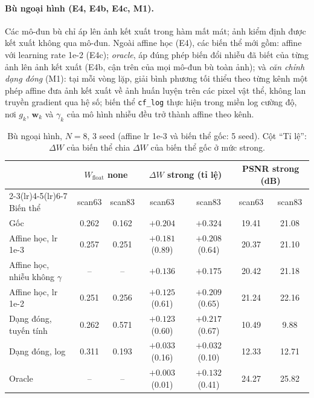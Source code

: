 \documentclass[11pt,a4paper]{article}
\begin{document}
\paragraph{Bù ngoại hình (E4, E4b, E4c, M1).} Các mô-đun bù chỉ áp lên ảnh kết xuất trong hàm mất mát; ảnh kiểm định được kết xuất không qua mô-đun. Ngoài affine học (E4), các biến thể mới gồm: affine với learning rate 1e-2 (E4c); \emph{oracle}, áp đúng phép biến đổi nhiễu đã biết của từng ảnh lên ảnh kết xuất (E4b, cận trên của mọi mô-đun bù toàn ảnh); và \emph{căn chỉnh dạng đóng} (M1): tại mỗi vòng lặp, giải bình phương tối thiểu theo từng kênh một phép affine đưa ảnh kết xuất về ảnh huấn luyện trên các pixel vật thể, không lan truyền gradient qua hệ số; biến thể \texttt{cf\_log} thực hiện trong miền log cường độ, nơi $g_k$, $\mathbf{w}_k$ và $\gamma_k$ của mô hình nhiễu đều trở thành affine theo kênh.
\begin{table}[H]
\centering\small
\caption{Bù ngoại hình, $N=8$, 3 seed (affine lr 1e-3 và biến thể gốc: 5 seed). Cột ``Tỉ lệ'': $\Delta W$ của biến thể chia $\Delta W$ của biến thể gốc ở mức strong.}
\label{tab:comp}
\begin{tabular}{@{}lcccccc@{}}
\toprule
& \multicolumn{2}{c}{$W_{\text{float}}$ none} & \multicolumn{2}{c}{$\Delta W$ strong (tỉ lệ)} & \multicolumn{2}{c}{PSNR strong (dB)} \\
\cmidrule(lr){2-3}\cmidrule(lr){4-5}\cmidrule(lr){6-7}
Biến thể & scan63 & scan83 & scan63 & scan83 & scan63 & scan83 \\
\midrule
Gốc & 0.262 & 0.162 & $+0.204$ & $+0.324$ & 19.41 & 21.08 \\
Affine học, lr 1e-3 & 0.257 & 0.251 & $+0.181$ (0.89) & $+0.208$ (0.64) & 20.37 & 21.10 \\
Affine học, nhiễu không $\gamma$ & -- & -- & $+0.136$ & $+0.175$ & 20.42 & 21.18 \\
Affine học, lr 1e-2 & 0.251 & 0.256 & $+0.125$ (0.61) & $+0.209$ (0.65) & 21.24 & 22.16 \\
Dạng đóng, tuyến tính & 0.262 & 0.571 & $+0.123$ (0.60) & $+0.217$ (0.67) & 10.49 & 9.88 \\
Dạng đóng, log & 0.311 & 0.193 & $+0.033$ (0.16) & $+0.032$ (0.10) & 12.33 & 12.71 \\
Oracle & -- & -- & $+0.003$ (0.01) & $+0.132$ (0.41) & 24.27 & 25.82 \\
\bottomrule
\end{tabular}
\end{table}
\end{document}
